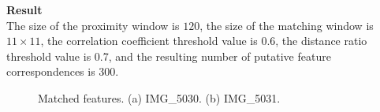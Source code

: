 \documentclass{../../assignment}
\begin{document}
\begin{problemlist}
\begin{enumerate}
\textbf{Result}\\
The size of the proximity window is $120$, the size of the matching window is $11\times11$, the correlation coefficient threshold value is 0.6, the distance ratio threshold value is 0.7, and the resulting number of putative feature correspondences is 300.\\
\begin{figure}[H]
\caption{Matched features. (a) IMG\_5030. (b) IMG\_5031.}
\label{fig:images}
\end{figure} 


\end{enumerate}
\end{problemlist}
\end{document}
